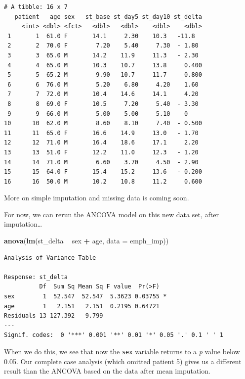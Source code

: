 \documentclass[]{book}
\newenvironment{Shaded}{\begin{snugshade}}{\end{snugshade}}
\newcommand{\KeywordTok}[1]{\textcolor[rgb]{0.13,0.29,0.53}{\textbf{#1}}}
\newcommand{\DataTypeTok}[1]{\textcolor[rgb]{0.13,0.29,0.53}{#1}}
\newcommand{\StringTok}[1]{\textcolor[rgb]{0.31,0.60,0.02}{#1}}
\newcommand{\OperatorTok}[1]{\textcolor[rgb]{0.81,0.36,0.00}{\textbf{#1}}}
\newcommand{\NormalTok}[1]{#1}
\theoremstyle{definition}
\theoremstyle{definition}
\theoremstyle{definition}
\theoremstyle{remark}
\begin{document}
\begin{verbatim}
# A tibble: 16 x 7
   patient   age sex   st_base st_day5 st_day10 st_delta
     <int> <dbl> <fct>   <dbl>   <dbl>    <dbl>    <dbl>
 1       1  61.0 F       14.1     2.30    10.3   -11.8  
 2       2  70.0 F        7.20    5.40     7.30  - 1.80 
 3       3  65.0 M       14.2    11.9     11.3   - 2.30 
 4       4  65.0 M       10.3    10.7     13.8     0.400
 5       5  65.2 M        9.90   10.7     11.7     0.800
 6       6  76.0 M        5.20    6.80     4.20    1.60 
 7       7  72.0 M       10.4    14.6     14.1     4.20 
 8       8  69.0 F       10.5     7.20     5.40  - 3.30 
 9       9  66.0 M        5.00    5.00     5.10    0    
10      10  62.0 M        8.60    8.10     7.40  - 0.500
11      11  65.0 F       16.6    14.9     13.0   - 1.70 
12      12  71.0 M       16.4    18.6     17.1     2.20 
13      13  51.0 F       12.2    11.0     12.3   - 1.20 
14      14  71.0 M        6.60    3.70     4.50  - 2.90 
15      15  64.0 F       15.4    15.2     13.6   - 0.200
16      16  50.0 M       10.2    10.8     11.2     0.600
\end{verbatim}

More on simple imputation and missing data is coming soon.

For now, we can rerun the ANCOVA model on this new data set, after
imputation\ldots{}

\begin{Shaded}
\begin{Highlighting}[]
\KeywordTok{anova}\NormalTok{(}\KeywordTok{lm}\NormalTok{(st_delta }\OperatorTok{~}\StringTok{ }\NormalTok{sex }\OperatorTok{+}\StringTok{ }\NormalTok{age, }\DataTypeTok{data =}\NormalTok{ emph_imp))}
\end{Highlighting}
\end{Shaded}

\begin{verbatim}
Analysis of Variance Table

Response: st_delta
          Df  Sum Sq Mean Sq F value  Pr(>F)  
sex        1  52.547  52.547  5.3623 0.03755 *
age        1   2.151   2.151  0.2195 0.64721  
Residuals 13 127.392   9.799                  
---
Signif. codes:  0 '***' 0.001 '**' 0.01 '*' 0.05 '.' 0.1 ' ' 1
\end{verbatim}

When we do this, we see that now the \texttt{sex} variable returns to a
\emph{p} value below 0.05. Our complete case analysis (which omitted
patient 5) gives us a different result than the ANCOVA based on the data
after mean imputation.
\end{document}
